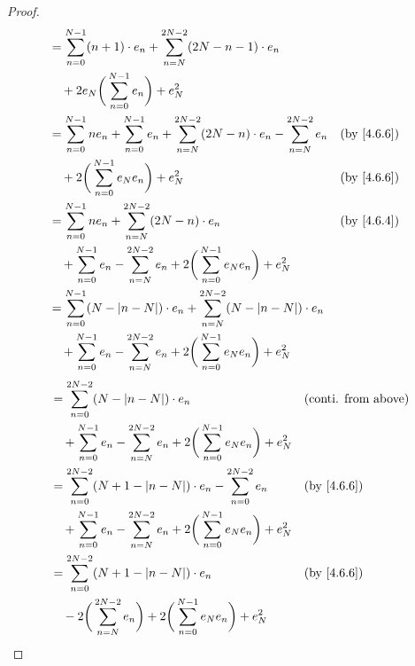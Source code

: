 \begin{proof}
\begin{align*}
     & = \sum_{n = 0}^{N - 1} (n + 1) \cdot e_n + \sum_{n = N}^{2N - 2} (2N - n - 1) \cdot e_n                                                        \\
     & \quad + 2 e_N \bigg(\sum_{n = 0}^{N - 1} e_n\bigg) + e_N^2                                                                                     \\
     & = \sum_{n = 0}^{N - 1} n e_n + \sum_{n = 0}^{N - 1} e_n + \sum_{n = N}^{2N - 2} (2N - n) \cdot e_n - \sum_{n = N}^{2N - 2} e_n &  & \by{4.6.6} \\
     & \quad + 2 \bigg(\sum_{n = 0}^{N - 1} e_N e_n\bigg) + e_N^2                                                                     &  & \by{4.6.6} \\
     & = \sum_{n = 0}^{N - 1} n e_n + \sum_{n = N}^{2N - 2} (2N - n) \cdot e_n                                                        &  & \by{4.6.4} \\
     & \quad + \sum_{n = 0}^{N - 1} e_n - \sum_{n = N}^{2N - 2} e_n + 2 \bigg(\sum_{n = 0}^{N - 1} e_N e_n\bigg) + e_N^2                              \\
     & = \sum_{n = 0}^{N - 1} (N - \abs{n - N}) \cdot e_n + \sum_{n = N}^{2N - 2} (N - \abs{n - N}) \cdot e_n                                         \\
     & \quad + \sum_{n = 0}^{N - 1} e_n - \sum_{n = N}^{2N - 2} e_n + 2 \bigg(\sum_{n = 0}^{N - 1} e_N e_n\bigg) + e_N^2
  \end{align*}
  \begin{align*}
     & = \sum_{n = 0}^{2N - 2} (N - \abs{n - N}) \cdot e_n                                                               &  & \text{(conti. from above)} \\
     & \quad + \sum_{n = 0}^{N - 1} e_n - \sum_{n = N}^{2N - 2} e_n + 2 \bigg(\sum_{n = 0}^{N - 1} e_N e_n\bigg) + e_N^2                                 \\
     & = \sum_{n = 0}^{2N - 2} (N + 1 - \abs{n - N}) \cdot e_n - \sum_{n = 0}^{2N - 2} e_n                               &  & \by{4.6.6}                 \\
     & \quad + \sum_{n = 0}^{N - 1} e_n - \sum_{n = N}^{2N - 2} e_n + 2 \bigg(\sum_{n = 0}^{N - 1} e_N e_n\bigg) + e_N^2                                 \\
     & = \sum_{n = 0}^{2N - 2} (N + 1 - \abs{n - N}) \cdot e_n                                                           &  & \by{4.6.6}                 \\
     & \quad - 2 \bigg(\sum_{n = N}^{2N - 2} e_n\bigg) + 2 \bigg(\sum_{n = 0}^{N - 1} e_N e_n\bigg) + e_N^2                                              \\

\end{align*}
\end{proof}

